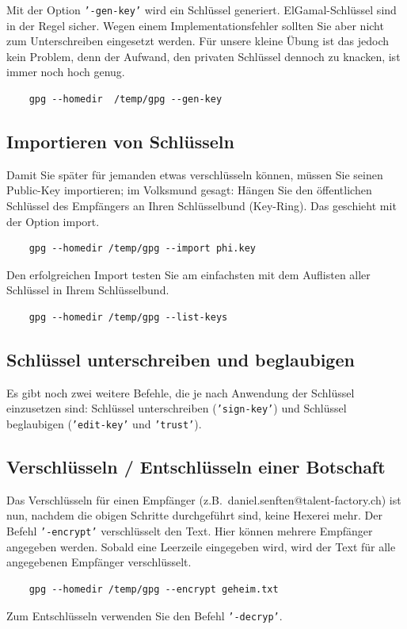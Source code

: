 Mit der Option \texttt{'-gen-key'} wird ein Schlüssel generiert. ElGamal-Schlüssel
sind in der Regel sicher. Wegen einem Implementationsfehler sollten Sie aber nicht
zum Unterschreiben eingesetzt werden. Für unsere kleine Übung ist das jedoch kein
Problem, denn der Aufwand, den privaten Schlüssel dennoch zu knacken, ist immer
noch hoch genug.

\begin{verbatim}
    gpg --homedir  /temp/gpg --gen-key
\end{verbatim}

\subsection{Importieren von Schlüsseln}
\label{subsec:gpg-key-import}

Damit Sie später für jemanden etwas verschlüsseln können, müssen Sie seinen
Public-Key importieren; im Volksmund gesagt: Hängen Sie den öffentlichen Schlüssel
des Empfängers an Ihren Schlüsselbund (Key-Ring). Das geschieht mit der Option import.

\begin{verbatim}
    gpg --homedir /temp/gpg --import phi.key
\end{verbatim}

Den erfolgreichen Import testen Sie am einfachsten mit dem Auflisten aller
Schlüssel in Ihrem Schlüsselbund.

\begin{verbatim}
    gpg --homedir /temp/gpg --list-keys
\end{verbatim}

\subsection{Schlüssel unterschreiben und beglaubigen}
\label{subsec:gpg-sign-key}

Es gibt noch zwei weitere Befehle, die je nach Anwendung der Schlüssel einzusetzen
sind: Schlüssel unterschreiben (\texttt{'sign-key'}) und Schlüssel beglaubigen
(\texttt{'edit-key'} und \texttt{'trust'}).

\subsection{Verschlüsseln / Entschlüsseln einer Botschaft}
\label{subsec:gpg-encrypt-decrypt}


Das Verschlüsseln für einen Empfänger (z.B.~daniel.senften@talent-factory.ch) ist nun,
nachdem die obigen Schritte durchgeführt sind, keine Hexerei mehr. Der Befehl
\texttt{'-encrypt'} verschlüsselt den Text. Hier können mehrere Empfänger angegeben
werden. Sobald eine Leerzeile eingegeben wird, wird der Text für alle angegebenen
Empfänger verschlüsselt.

\begin{verbatim}
    gpg --homedir /temp/gpg --encrypt geheim.txt
\end{verbatim}

Zum Entschlüsseln verwenden Sie den Befehl \texttt{'-decryp'}.


